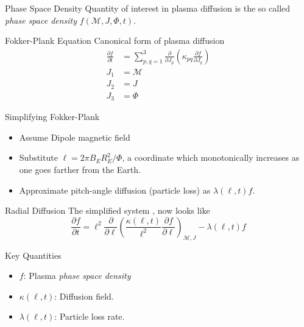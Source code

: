 \documentclass{beamer}
\begin{document}
\begin{frame}{Phase Space Density}
  Quantity of interest in plasma diffusion is the so called
  \emph{phase space density} $f(\mathcal{M}, J, \Phi, t)$.
\end{frame}

\begin{frame}{Fokker-Plank Equation}
  Canonical form of plasma diffusion \cite{Schulz1974} 
  \begin{align*}
    \frac{\partial{f}}{\partial{t}} &= \sum^{3}_{p,q = 1}
    \frac{\partial}{\partial{J_{p}}} \left( \kappa_{pq}
    \frac{\partial{f}}{\partial{J_{q}}} \right) \\
    J_1 &= \mathcal{M} \\
    J_2 &= J \\
    J_{3} &= \Phi
  \end{align*}
\end{frame}

\begin{frame}{Simplifying Fokker-Plank}

  \begin{itemize}
  \item Assume Dipole magnetic field
  \item Substitute $\ell = 2 \pi B_{E} R^{2}_{E}/\Phi$, a coordinate
    which monotonically increases as one goes farther from the Earth.
  \item Approximate pitch-angle diffusion (particle loss) as
    $\lambda(\ell, t) f$.
  \end{itemize}
\end{frame}

\begin{frame}{Radial Diffusion}
  The simplified system \cite{Walt1970}, now looks like
  \begin{equation*}
    \frac{\partial{f}}{\partial{t}} = \ell^2 \frac{\partial}{\partial{\ell}} \left( \frac{\kappa(\ell,
        t)}{\ell^{2}} \frac{\partial{f}}{\partial{\ell}}
    \right)_{\mathcal{M}, J} - \lambda(\ell,
    t) f
  \end{equation*}

  
\end{frame}

\begin{frame}{Key Quantities}
  \begin{itemize}
  \item {
      $f$: Plasma \emph{phase space density}
    \pause %
  }
  \item {   
      $\kappa(\ell, t)$: Diffusion field.
  }
  \item<3-> {
    $\lambda(\ell, t)$: Particle loss rate.
  }
  \end{itemize}
\end{frame}
\end{document}
